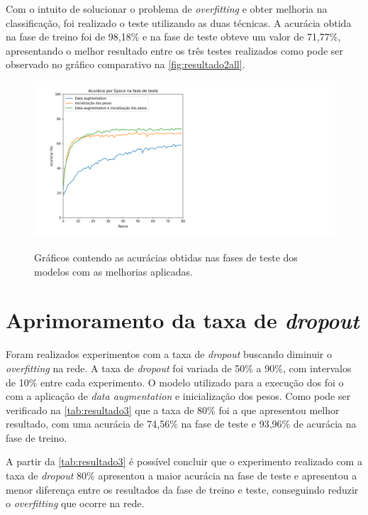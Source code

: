 \par Com o intuito de solucionar o problema de \textit{overfitting} e obter melhoria na classificação, foi realizado o teste utilizando as duas técnicas. A acurácia obtida na fase de treino foi de 98,18\% e na fase de teste obteve um valor de 71,77\%, apresentando o melhor resultado entre os três testes realizados como pode ser observado no gráfico comparativo na \autoref{fig:resultado2all}.%
\begin{figure}[H]
  \centering
  \caption{Gráficos contendo as acurácias obtidas nas fases de teste dos modelos com as melhorias aplicadas.}
  \includegraphics[width=500pt]{dados/figuras/resultado2_all}
  \label{fig:resultado2all}
\end{figure}
 
\section{Aprimoramento da taxa de \textit{dropout}}
Foram realizados experimentos com a taxa de \textit{dropout} buscando diminuir o \textit{overfitting} na rede. A taxa de \textit{dropout} foi variada de 50\% a 90\%, com intervalos de 10\% entre cada experimento. O modelo utilizado para a execução dos foi o com a aplicação de \textit{data augmentation} e inicialização dos pesos. Como pode ser verificado na \autoref{tab:resultado3} que a taxa de 80\% foi a que apresentou melhor resultado, com uma acurácia de 74,56\% na fase de teste e 93,96\% de acurácia na fase de treino.



\par A partir da \autoref{tab:resultado3} é possível concluir que o experimento realizado com a taxa de \textit{dropout} 80\% apresentou a maior acurácia na fase de teste e apresentou a menor diferença entre os resultados da fase de treino e teste, conseguindo reduzir o \textit{overfitting} que ocorre na rede. 

